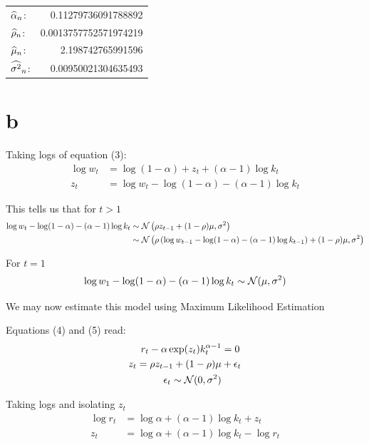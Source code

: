 \documentclass[12pt, letterpaper]{paper}
\begin{document}
\begin{center}
\begin{tabular}{lr}
\(\widehat{ \alpha }_{n}\): & 0.11279736091788892\\
\(\widehat{ \rho }_{n}\): & 0.0013757752571974219\\
\(\widehat{ \mu }_{n}\): & 2.198742765991596\\
\(\widehat{ \sigma^{2} }_{n}\): & 0.00950021304635493\\
\end{tabular}
\end{center}

\section{b}
\label{sec:org9811163}

Taking logs of equation (3):
\begin{align*}
  \log w_t &= \log ( 1- \alpha) + z_t + (\alpha-1) \log k_t\\
  z_t &= \log w_t - \log ( 1- \alpha) - (\alpha-1) \log k_t
\end{align*}

This tells us that for $t > 1$
\begin{align*}
  \log w_t - \log ( 1- \alpha) - (\alpha-1) \log k_t &\sim \mathcal{N}\left( \rho z_{t-1} +
                                             (1-\rho)\mu, \sigma^2 \right)\\
  &\sim \mathcal{N}\left( \rho\left( \log w_{t-1} - \log( 1- \alpha) -(\alpha-1) \log
    k_{t-1} \right) + (1-\rho)\mu, \sigma^2 \right)
\end{align*}

For $t=1$
\begin{equation*}
  \log w_1 - \log ( 1- \alpha) - (\alpha-1) \log k_t \sim \mathcal{N}( \mu, \sigma^2)
\end{equation*}


We may now estimate this model using Maximum Likelihood Estimation

Equations (4) and (5) read:
\begin{align*}
  r_t - \alpha \exp( z_t ) k_t^{\alpha -1 } &= 0\\
  z_t = \rho z_{t-1} + (1-\rho)\mu &+ \epsilon_t\\
  \epsilon_t \sim \mathcal{N}( 0, \sigma^2)
\end{align*}

Taking logs and isolating $z_t$
\begin{align*}
  \log r_t  &= \log \alpha + (\alpha-1) \log k_t + z_t\\
  z_t &= \log \alpha + (\alpha-1) \log k_t - \log r_t
\end{align*}
\end{document}
